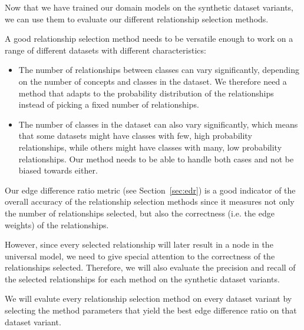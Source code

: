 \graphicspath{{figures/}}

Now that we have trained our domain models on the synthetic dataset variants,
we can use them to evaluate our different relationship selection methods.

A good relationship selection method needs to be versatile enough
to work on a range of different datasets with different characteristics:
\begin{itemize}
      \item The number of relationships between classes can vary significantly,
            depending on the number of concepts and classes in the dataset.
            We therefore need a method that adapts to the probability distribution of the relationships
            instead of picking a fixed number of relationships.
      \item The number of classes in the dataset can also vary significantly,
            which means that some datasets might have classes with few, high probability relationships,
            while others might have classes with many, low probability relationships.
            Our method needs to be able to handle both cases
            and not be biased towards either.
\end{itemize}

Our edge difference ratio metric (see Section~\ref{sec:edr})
is a good indicator of the overall accuracy of the relationship selection methods
since it measures not only the number of relationships selected,
but also the correctness (i.e. the edge weights) of the relationships.

However, since every selected relationship will later result
in a node in the universal model,
we need to give special attention to the correctness of the relationships selected.
Therefore, we will also evaluate the precision and recall of the selected relationships
for each method on the synthetic dataset variants.

We will evalute every relationship selection method on every dataset variant
by selecting the method parameters that yield the best edge difference ratio
on that dataset variant.



